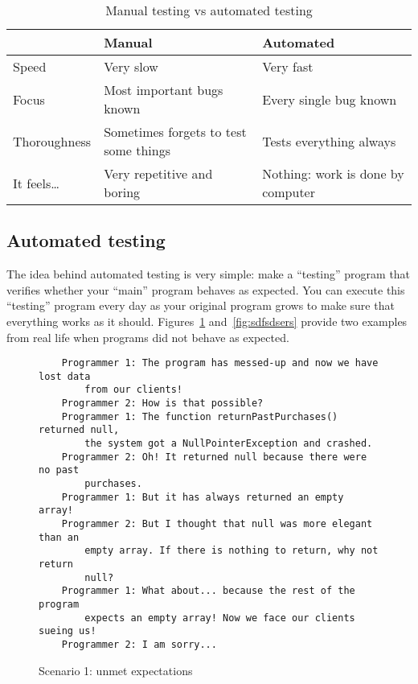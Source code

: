 \begin{table}[htbp]
  \centering
  \begin{tabular}{|p{2.5cm}|p{5.8cm}|p{5.5cm}|}
    \hline
    & Manual & Automated \\
    \hline
    Speed & Very slow & Very fast \\
    Focus & Most important bugs known & Every single bug known \\
    Thoroughness & Sometimes forgets to test some things & Tests everything always \\
    It feels\ldots & Very repetitive and boring & Nothing: work is done by computer \\
    \hline
  \end{tabular}
  \caption{Manual testing vs automated testing}
  \label{tab:test}
\end{table}

\subsection{Automated testing}
\label{sec:automated-testing}

The idea behind automated testing is very simple: make a ``testing'' program that
verifies whether your ``main'' program behaves as expected. You can execute
this ``testing'' program every day as your original program grows to
make sure that everything works as it
should. Figures~\ref{fig:sdddfsdsrrers} and~\ref{fig:sdfsdsers} provide
two examples from real life when programs did not behave as expected. 

\begin{figure}[tbp]
\begin{verbatim}
    Programmer 1: The program has messed-up and now we have lost data
        from our clients!
    Programmer 2: How is that possible?
    Programmer 1: The function returnPastPurchases() returned null,
        the system got a NullPointerException and crashed. 
    Programmer 2: Oh! It returned null because there were no past
        purchases. 
    Programmer 1: But it has always returned an empty array! 
    Programmer 2: But I thought that null was more elegant than an
        empty array. If there is nothing to return, why not return
        null? 
    Programmer 1: What about... because the rest of the program
        expects an empty array! Now we face our clients sueing us!
    Programmer 2: I am sorry...
\end{verbatim}  
  \caption{Scenario 1: unmet expectations}
  \label{fig:sdddfsdsrrers}
\end{figure}

